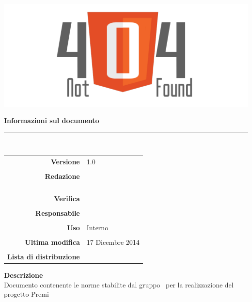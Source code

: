 \thispagestyle{empty}

\begin{titlepage}
	\begin{center}
	\begin{Huge}
		\textbf{\gruppo} \\
	\end{Huge}
	\vspace{0.5cm}
	\begin{Large}
		\textbf{\capitolato}
	\end{Large}
	
	\vspace{1cm}
    
	\includegraphics[scale=0.35]{../logo/logo404_Extends.png}
	\vspace{1cm}
	\begin{Huge}
		\textbf{\titDoc}
	\end{Huge}
	
	\vspace{1cm}
	\textbf{Informazioni sul documento}\\
    \rule{10cm}{.4pt} \\
	\begin{table}[h]
	\begin{center}
	\begin{tabular}{r | l}
		\textbf{Versione} & 1.0 \\ \\
		\textbf{Redazione} & \CoMa \\
			& \GoIs \\ 
			& \MaMo \\ 
			& \CaMa \\ \\
		\textbf{Verifica} &\DeEn \\ \\
		\textbf{Responsabile} & \VeFe \\ \\
		\textbf{Uso} & Interno \\ \\
		\textbf{Ultima modifica} & 17 Dicembre 2014 \\ \\
		\textbf{Lista di distribuzione} & \gruppo \\ 
	\end{tabular}
	\end{center}
	\end{table}
			\textbf{Descrizione} \\
			Documento contenente le norme stabilite dal gruppo \gruppo\ per la realizzazione del progetto Premi
	\end{center}
\end{titlepage}